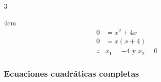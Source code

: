 {\begin{multicols}{3}
\begin{parts}
                \begin{solutionbox}{4cm}
                    \begin{align*}
                        0          & =	      x^2+4x            \\
                        0          & =		 x(x+4)                \\
                        \therefore & x_1 =-4 \text{ y } x_2 =0
                    \end{align*}
                \end{solutionbox}
            \end{parts}
        \end{multicols}
    }

    \subsubsection{Ecuaciones cuadráticas completas}

